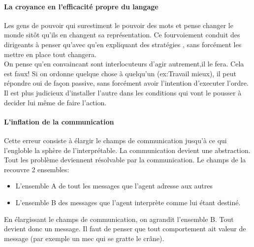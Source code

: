 \documentclass[11pt]{article} %
\begin{document}
		\paragraph{La croyance en l'efficacité propre du langage} Les gens de pouvoir qui surestiment le 
		pouvoir des mots et pense changer le monde sitôt qu'ils en changent sa représentation. Ce 
		fourvoiement conduit des dirigeants à penser qu'avec qu'en expliquant des stratégies , sans forcément 
		les mettre en place tout changera.\\
		On pense qu'en convaincant sont interlocuteurs d'agir autrement,il le fera. Cela est faux! Si on ordonne
		quelque chose à quelqu'un (ex:Travail mieux), il peut répondre oui de façon passive, sans forcément 
		avoir l'intention d'executer l'ordre. Il est plus judicieux d'installer l'autre dans les conditions qui vont le 
		pousser à decider lui même de faire l'action. 
		\paragraph{L'inflation de la communication} Cette erreur consiste à élargir le champs de 
		communication jusqu'à ce qui l'engloble la sphère de l'interprétable. La communication devient une 
		abstraction. Tout les problème deviennent résolvable par la communication.  Le champs de la recouvre 
		2 ensembles:
		\begin{itemize}
			\item L'ensemble A de tout les messages que l'agent adresse aux autres
			\item L'ensemble B des messages que l'agent interprète comme lui étant destiné. 
		\end{itemize}
		En élargissant le champs de communication, on agrandit l'ensemble B. Tout devient donc un message.
		 Il faut de penser que tout comportement ait valeur de message (par exemple un mec qui se gratte le 
		 crâne).
\end{document}
